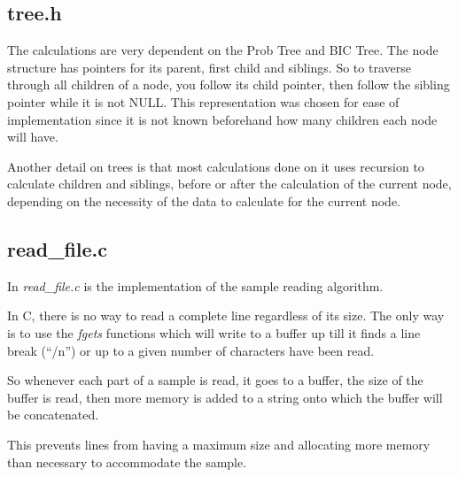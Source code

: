 \documentclass[brazil,11pt]{article}
\begin{document}
\subsection{tree.h}

The calculations are very dependent on the Prob Tree and BIC Tree. The node structure has pointers for its parent, first child and siblings. So to traverse through all children of a node, you follow its child pointer, then follow the sibling pointer while it is not NULL. This representation was chosen for ease of implementation since it is not known beforehand how many children each node will have.

Another detail on trees is that most calculations done on it uses recursion to calculate children and siblings, before or after the calculation of the current node, depending on the necessity of the data to calculate for the current node.

\subsection{read\_file.c}
 
In \emph{read\_file.c} is the implementation of the sample reading algorithm.

In C, there is no way to read a complete line regardless of its size. The only way is to use the \emph{fgets} functions which will write to a buffer up till it finds a line break (``/n'') or up to a given number of characters have been read.

So whenever each part of a sample is read, it goes to a buffer, the size of the buffer is read, then more memory is added to a string onto which the buffer will be concatenated.

This prevents lines from having a maximum size and allocating more memory than necessary to accommodate the sample.
\end{document}
